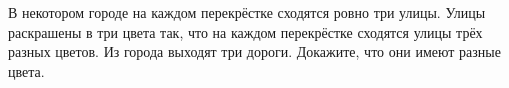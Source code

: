 В некотором городе на каждом перекрёстке сходятся ровно три улицы. Улицы раскрашены в три цвета так, что на каждом перекрёстке сходятся улицы трёх разных цветов. Из города выходят три дороги. Докажите, что они имеют разные цвета.